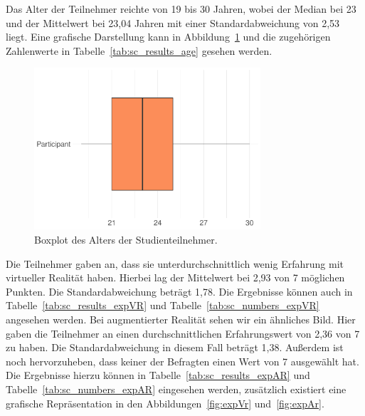 Das Alter der Teilnehmer reichte von 19 bis 30 Jahren, wobei der Median bei 23 und der Mittelwert bei 23,04 Jahren mit einer Standardabweichung von 2,53 liegt. Eine grafische Darstellung kann in Abbildung~\ref{fig:age} und die zugehörigen Zahlenwerte in Tabelle~\ref{tab:sc_results_age} gesehen werden.

\begin{figure}[H]
	\centering
	\includegraphics[width=0.75\textwidth]{./_StudyResults/age}
	\caption{Boxplot des Alters der Studienteilnehmer.}
	\label{fig:age}
\end{figure}

Die Teilnehmer gaben an, dass sie unterdurchschnittlich wenig Erfahrung mit virtueller Realität haben. Hierbei lag der Mittelwert bei 2,93 von 7 möglichen Punkten. Die Standardabweichung beträgt 1,78. Die Ergebnisse können auch in Tabelle~\ref{tab:sc_results_expVR} und Tabelle~\ref{tab:sc_numbers_expVR} angesehen werden. 
Bei augmentierter Realität sehen wir ein ähnliches Bild. Hier gaben die Teilnehmer an einen durchschnittlichen Erfahrungswert von 2,36 von 7 zu haben. Die Standardabweichung in diesem Fall beträgt 1,38. Außerdem ist noch hervorzuheben, dass keiner der Befragten einen Wert von 7 ausgewählt hat. 
Die Ergebnisse hierzu können in Tabelle~\ref{tab:sc_results_expAR} und Tabelle~\ref{tab:sc_numbers_expAR} eingesehen werden, zusätzlich existiert eine grafische Repräsentation in den Abbildungen~\ref{fig:expVr} und~\ref{fig:expAr}.


